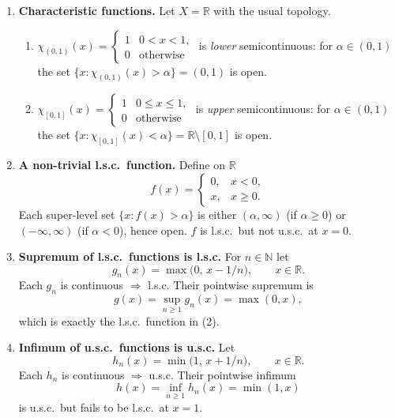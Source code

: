 \documentclass[12pt]{article}
\theoremstyle{definition} %
\theoremstyle{plain} %
\begin{document}
  \begin{enumerate}[]
  \item \textbf{Characteristic functions.}
        Let $X=\mathbb R$ with the usual topology.
        \begin{enumerate}[]
            \item $\displaystyle \chi_{(0,1)}(x)=
                     \begin{cases}
                         1 & 0<x<1,\\[2pt]
                         0 & \text{otherwise}
                     \end{cases}$
                  is \emph{lower} semicontinuous:
                  for $\alpha\in(0,1)$ the set $\{x:\chi_{(0,1)}(x)>\alpha\}=(0,1)$
                  is open.
            \item $\displaystyle \chi_{[0,1]}(x)=
                     \begin{cases}
                         1 & 0\le x\le1,\\[2pt]
                         0 & \text{otherwise}
                     \end{cases}$
                  is \emph{upper} semicontinuous:
                  for $\alpha\in(0,1)$ the set $\{x:\chi_{[0,1]}(x)<\alpha\}=\mathbb{R}\setminus[0,1]$
                  is open.
        \end{enumerate}
  
  \item \textbf{A non-trivial l.s.c.\ function.}
        Define on $\mathbb R$
        \[
            f(x)=
            \begin{cases}
                0, & x<0,\\
                x, & x\ge 0.
            \end{cases}
        \]
        Each super-level set $\{x:f(x)>\alpha\}$ is either $(\alpha,\infty)$
        (if $\alpha\ge0$) or $(-\infty,\infty)$ (if $\alpha<0$),
        hence open.  
        $f$ is l.s.c.\ but not u.s.c.\ at $x=0$.
  
  \item \textbf{Supremum of l.s.c.\ functions is l.s.c.}
        For $n\in\mathbb{N}$ let 
        \[
            g_n(x)=\max\!\bigl(0,\,x-1/n\bigr),\qquad x\in\mathbb R.
        \]
        Each $g_n$ is continuous $\Rightarrow$ l.s.c.  
        Their pointwise supremum is
        \[
            g(x)=\sup_{n\ge1} g_n(x)=\max(0,x),
        \]
        which is exactly the l.s.c.\ function in (2).  
  
  \item \textbf{Infimum of u.s.c.\ functions is u.s.c.}
        Let 
        \[
            h_n(x)=\min\!\bigl(1,\,x+1/n\bigr),\qquad x\in\mathbb R.
        \]
        Each $h_n$ is continuous $\Rightarrow$ u.s.c.  
        Their pointwise infimum
        \[
            h(x)=\inf_{n\ge1} h_n(x)=\min(1,x)
        \]
        is u.s.c.\ but fails to be l.s.c.\ at $x=1$.
  \end{enumerate}
  
\end{document}
